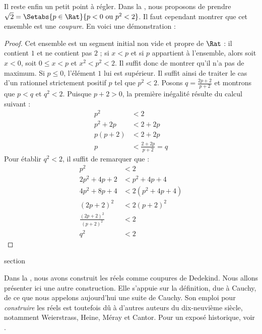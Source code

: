 \documentclass[11pt,a4paper,openany]{memoir}
\begin{document}
Il reste enfin un petit point à régler. Dans la ,
nous proposons de prendre
$\sqrt{2}=\Setabs{p \in \Rat}{p < 0 \text{ ou }p^2 < 2}$.
Il faut cependant montrer que cet ensemble est une \emph{coupure}.
En voici une démonstration :

\begin{proof}
Cet ensemble est un segment initial non vide et propre de $\Rat$ :
il contient $1$ et ne contient pas $2$ ; si $x<p$ et si $p$ appartient
à l'ensemble, alors soit $x<0$, soit $0\leq x<p$ et $x^2<p^2<2$.
Il suffit donc de montrer qu'il n'a pas de maximum. Si $p\leq0$,
l'élément $1$ lui est supérieur. Il suffit ainsi de traiter le cas
d'un rationnel strictement positif $p$ tel que $p^2<2$.
Posons $q=\frac{2p+2}{p+2}$ et montrons que $p<q$ et $q^2<2$.
Puisque $p+2>0$, la première inégalité résulte du calcul suivant :
\begin{align*}
  p^2 &< 2\\
  p^2 + 2p &< 2 + 2p\\
  p(p + 2) &< 2 + 2p\\
  p &< \tfrac{2+2p}{p+2} = q
\end{align*}
Pour établir $q^2<2$, il suffit de remarquer que :
\begin{align*}
  p^2 &< 2\\
  2p^2 + 4p + 2 &< p^2 + 4p+ 4\\
  4p^2 + 8p + 4 &< 2(p^2 + 4p + 4)\\
  (2p+2)^2 &< 2(p+2)^2\\
  \tfrac{(2p+2)^2}{(p+2)^2} &< 2\\
  q^2 &< 2
\end{align*}
\end{proof}

\endgroup


\begingroup
\expandafter\def\csname ol@sectioncs\endcsname{section}
\def\olfilename{cauchy}




Dans la , nous avons construit les réels comme coupures
de Dedekind. Nous allons présenter ici une autre construction. Elle
s'appuie sur la définition, due à Cauchy, de ce que nous appelons
aujourd'hui une suite de Cauchy. Son emploi pour \emph{construire} les
réels est toutefois dû à d'autres auteurs du dix-neuvième siècle,
notamment Weierstrass, Heine, M\'{e}ray et Cantor. Pour un exposé
historique, voir \citeauthor{OConnorRobertson:RN}
\citeyear{OConnorRobertson:RN}.
\end{document}
